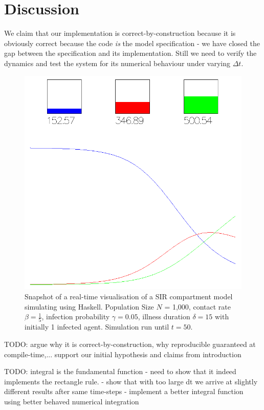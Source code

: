 \section{Discussion}
We claim that our implementation is correct-by-construction because it is obviously correct because the code \textit{is} the model specification - we have closed the gap between the specification and its implementation. Still we need to verify the dynamics and test the system for its numerical behaviour under varying $\Delta t$.

\begin{figure}
	\centering
	\includegraphics[width=.4\textwidth, angle=0]{./fig/visualisation_t50.png}
	\caption{Snapshot of a real-time visualisation of a SIR compartment model simulating using Haskell. Population Size $N$ = 1,000, contact rate $\beta =  \frac{1}{5}$, infection probability $\gamma = 0.05$, illness duration $\delta = 15$ with initially 1 infected agent. Simulation run until $t = 50$.}
	\label{fig:sir_sd_dynamics}
\end{figure}

TODO: argue why it is correct-by-construction, why reproducible guaranteed at compile-time,... support our initial hypothesis and claims from introduction

TODO: integral is the fundamental function
- need to show that it indeed implements the rectangle rule. 
- show that with too large dt we arrive at slightly different results after same time-steps
- implement a better integral function using better behaved numerical integration